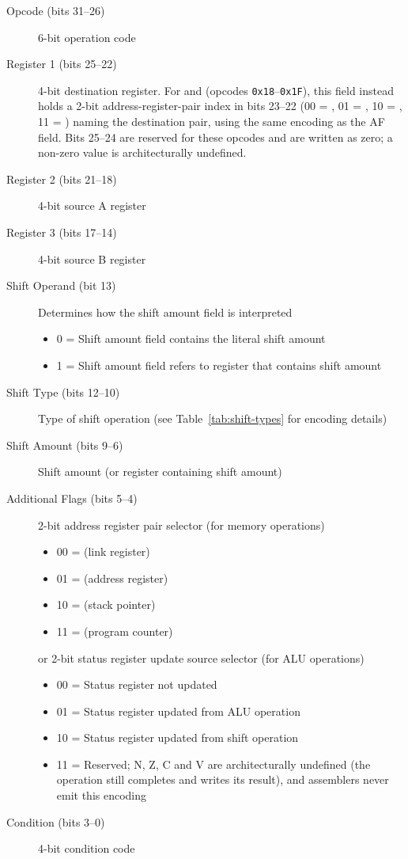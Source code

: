 \begin{description}
	\item[Opcode (bits 31--26)] 6-bit operation code
	\item[Register 1 (bits 25--22)] 4-bit destination register. For  and  (opcodes
	      \texttt{0x18}--\texttt{0x1F}), this field instead holds a 2-bit address-register-pair index in bits 23--22 (00 =
	      , 01 = , 10 = , 11 = ) naming the destination pair, using the same encoding as the AF
	      field. Bits 25--24 are reserved for these opcodes and are written as zero; a non-zero value is architecturally
	      undefined.
	\item[Register 2 (bits 21--18)] 4-bit source A register
	\item[Register 3 (bits 17--14)] 4-bit source B register
	\item[Shift Operand (bit 13)] Determines how the shift amount field is interpreted
	      \begin{itemize}
		      \item 0 = Shift amount field contains the literal shift amount
		      \item 1 = Shift amount field refers to register that contains shift amount
	      \end{itemize}
	\item[Shift Type (bits 12--10)] Type of shift operation (see Table~\ref{tab:shift-types} for encoding details)
	\item[Shift Amount (bits 9--6)] Shift amount (or register containing shift amount)
	\item[Additional Flags (bits 5--4)] 2-bit address register pair selector (for memory operations)
	      \begin{itemize}
		      \item 00 =  (link register)
		      \item 01 =  (address register)
		      \item 10 =  (stack pointer)
		      \item 11 =  (program counter)
	      \end{itemize}
	      or 2-bit status register update source selector (for ALU operations)
	      \begin{itemize}
		      \item 00 = Status register not updated
		      \item 01 = Status register updated from ALU operation
		      \item 10 = Status register updated from shift operation
		      \item 11 = Reserved; N, Z, C and V are architecturally undefined (the operation still completes and writes its result), and assemblers never emit this encoding
	      \end{itemize}
	\item[Condition (bits 3--0)] 4-bit condition code
\end{description}

